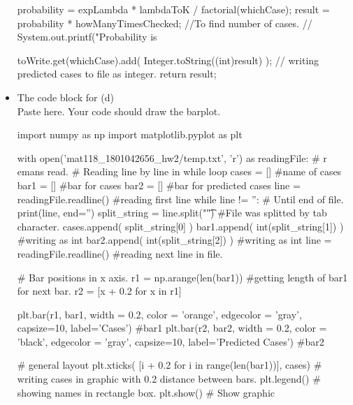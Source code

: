 \documentclass[a4 paper]{article}
\numberwithin{equation}{section}
\newcommand{\0}{\mathbf{0}}
\begin{document}
\begin{itemize}
\begin{python}[frame=single]
{            probability = expLambda * lambdaToK / factorial(whichCase);
            result = probability * howManyTimesChecked; //To find number of cases.
            // System.out.printf("Probability is %
    
            toWrite.get(whichCase).add( Integer.toString((int)result) ); // writing predicted cases to file as integer.
            return result;
        }
		\end{python}
		
		\newpage
		\item The code block for (d)\\
		Paste here. Your code should draw the barplot.
		\begin{python}[frame=single]
            import numpy as np
            import matplotlib.pyplot as plt
            
            
            with open('mat118_1801042656_hw2/temp.txt', 'r') as readingFile: # r emans read.
                # Reading line by line in while loop
                cases = []   #name of cases
                bar1 = []    #bar for cases
                bar2 = []    #bar for predicted cases
                line = readingFile.readline()  #reading first line
                while line != '':  # Until end of file.
                    print(line, end='')
                    split_string = line.split("\t") #File was splitted by tab character.
                    cases.append( split_string[0] )
                    bar1.append(  int(split_string[1]) ) #writing as int
                    bar2.append(  int(split_string[2]) ) #writing as int
                    line = readingFile.readline() #reading next line in file.
            
            # Bar positions in x axis.
            r1 = np.arange(len(bar1))   #getting length of bar1 for next bar.
            r2 = [x + 0.2 for x in r1]
            
            plt.bar(r1, bar1, width = 0.2, color = 'orange', edgecolor = 'gray', capsize=10, label='Cases')          #bar1
            plt.bar(r2, bar2, width = 0.2, color = 'black', edgecolor = 'gray', capsize=10, label='Predicted Cases') #bar2
            
            # general layout
            plt.xticks( [i + 0.2 for i in range(len(bar1))], cases) # writing cases in graphic with 0.2 distance between bars.
            plt.legend() # showing names in rectangle box.
            plt.show()   # Show graphic
		\end{python}
		
	\end{itemize}
	
	
	
	
\end{document}
